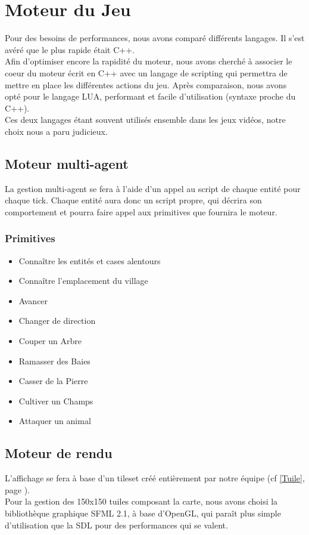 \documentclass[a4paper]{article}
\begin{document}
    \section{Moteur du Jeu}
      Pour des besoins de performances, nous avons comparé différents langages. Il s'est avéré que le plus rapide était C++.\\
      Afin d'optimiser encore la rapidité du moteur, nous avons cherché à associer le coeur du moteur écrit en C++ avec un langage de scripting qui permettra de mettre en place les différentes actions du jeu. Après comparaison, nous avons opté pour le langage LUA, performant et facile d'utilisation (syntaxe proche du C++).\\
      Ces deux langages étant souvent utilisés ensemble dans les jeux vidéos, notre choix nous a paru judicieux.

      \subsection{Moteur multi-agent}
        La gestion multi-agent se fera à l'aide d'un appel au script de chaque entité pour chaque tick. Chaque entité aura donc un script propre, qui décrira son comportement et pourra faire appel aux primitives que fournira le moteur.

        \subsubsection{Primitives}
          \begin{itemize} \small
            \item Connaître les entités et cases alentours
            \item Connaître l'emplacement du village
            \item Avancer
            \item Changer de direction
            \item Couper un Arbre
            \item Ramasser des Baies
            \item Casser de la Pierre
            \item Cultiver un Champs
            \item Attaquer un animal
          \end{itemize} \normalsize


        \subsection{Moteur de rendu}
          L'affichage se fera à base d'un tileset créé entièrement par notre équipe (cf \ref{Tuile}, page \pageref{Tuile}).\\
          Pour la gestion des 150x150 tuiles composant la carte, nous avons choisi la bibliothèque graphique SFML 2.1, à base d'OpenGL, qui paraît plus simple d'utilisation que la SDL pour des performances qui se valent.
\end{document}
